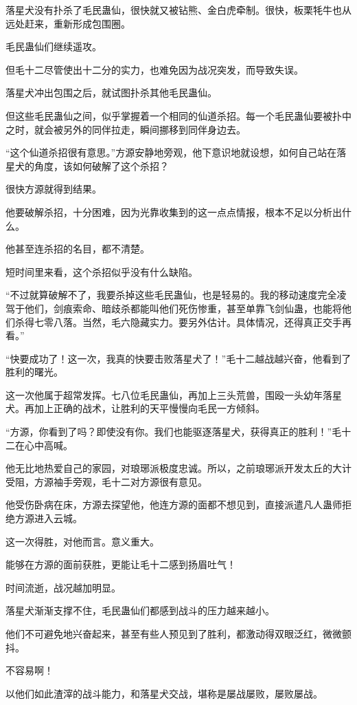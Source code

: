\begin{this_body}
落星犬没有扑杀了毛民蛊仙，很快就又被钻熊、金白虎牵制。很快，板栗牦牛也从远处赶来，重新形成包围圈。

毛民蛊仙们继续遥攻。

但毛十二尽管使出十二分的实力，也难免因为战况突发，而导致失误。

落星犬冲出包围之后，就试图扑杀其他毛民蛊仙。

但这些毛民蛊仙之间，似乎掌握着一个相同的仙道杀招。每一个毛民蛊仙要被扑中之时，就会被另外的同伴拉走，瞬间挪移到同伴身边去。

“这个仙道杀招很有意思。”方源安静地旁观，他下意识地就设想，如何自己站在落星犬的角度，该如何破解了这个杀招？

很快方源就得到结果。

他要破解杀招，十分困难，因为光靠收集到的这一点点情报，根本不足以分析出什么。

他甚至连杀招的名目，都不清楚。

短时间里来看，这个杀招似乎没有什么缺陷。

“不过就算破解不了，我要杀掉这些毛民蛊仙，也是轻易的。我的移动速度完全凌驾于他们，剑痕索命、暗歧杀都能叫他们死伤惨重，甚至单靠飞剑仙蛊，也能将他们杀得七零八落。当然，毛六隐藏实力。要另外估计。具体情况，还得真正交手再看。”

“快要成功了！这一次，我真的快要击败落星犬了！”毛十二越战越兴奋，他看到了胜利的曙光。

这一次他属于超常发挥。七八位毛民蛊仙，再加上三头荒兽，围殴一头幼年落星犬。再加上正确的战术，让胜利的天平慢慢向毛民一方倾斜。

“方源，你看到了吗？即使没有你。我们也能驱逐落星犬，获得真正的胜利！”毛十二在心中高喊。

他无比地热爱自己的家园，对琅琊派极度忠诚。所以，之前琅琊派开发太丘的大计受阻，方源袖手旁观，毛十二对方源很有意见。

他受伤卧病在床，方源去探望他，他连方源的面都不想见到，直接派遣凡人蛊师拒绝方源进入云城。

这一次得胜，对他而言。意义重大。

能够在方源的面前获胜，更能让毛十二感到扬眉吐气！

时间流逝，战况越加明显。

落星犬渐渐支撑不住，毛民蛊仙们都感到战斗的压力越来越小。

他们不可避免地兴奋起来，甚至有些人预见到了胜利，都激动得双眼泛红，微微颤抖。

不容易啊！

以他们如此渣滓的战斗能力，和落星犬交战，堪称是屡战屡败，屡败屡战。


\end{this_body}
